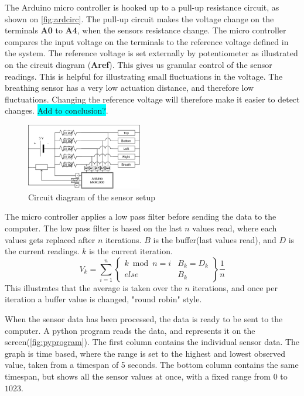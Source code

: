 \documentclass{sigchi-ext}
\begin{document}
The Arduino micro controller is hooked up to a pull-up resistance circuit, as shown on \autoref{fig:ardcirc}. The pull-up circuit makes the voltage change on the terminals \textbf{A0} to \textbf{A4}, when the sensors resistance change. 
The micro controller compares the input voltage on the terminals to the reference voltage defined in the system. The reference voltage is set externally by potentiometer as illustrated on the circuit diagram (\textbf{Aref}). This gives us granular control of the sensor readings. This is helpful for illustrating small fluctuations in the voltage. The breathing sensor has a very low actuation distance, and therefore low fluctuations. Changing the reference voltage will therefore make it easier to detect changes.  
\colorbox{cyan}{Add to conclusion?}.

\begin{figure} [H]
   \centering \includegraphics[width=0.45\textwidth]{img/arduino_diagram}
    \caption{Circuit diagram of the sensor setup}
    \label{fig:ardcirc}
\end{figure}

The micro controller applies a low pass filter before sending the data to the computer. The low pass filter is based on the last $n$ values read, where each values gets replaced after $n$ iterations. $B$ is the buffer(last values read), and $D$ is the current readings. $k$ is the current iteration.
$$
V_k= \sum\limits_{i=1}^n 
\left\{
\begin{array}{ll}
    k \bmod n = i & B_k = D_k\\
    else          & B_k
\end{array}\right\}\frac{1}{n}
$$
This illustrates that the average is taken over the $n$ iterations, and once per iteration a buffer value is changed, "round robin" style.

When the sensor data has been processed, the data is ready to be sent to the computer. A python program reads the data, and represents it on the screen(\autoref{fig:pyprogram}).
The first column contains the individual sensor data. The graph is time based, where the range is set to the highest and lowest observed value, taken from a timespan of 5 seconds.
The bottom column contains the same timespan, but shows all the sensor values at once, with a fixed range from $0$ to $1023$.
\end{document}

